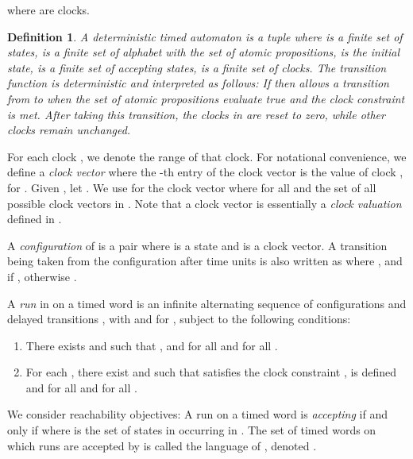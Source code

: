\documentclass[letterpaper, 10 pt, conference]{ieeeconf}
\newtheorem{definition}{Definition}
\begin{document}
where  are clocks.
\begin{definition}\cite{Alur1994183}
  A \emph{deterministic timed automaton} is a tuple
   where  is a
  finite set of states,  is a finite set of alphabet with
  the set  of atomic propositions,  is the initial
  state,  is a finite set of accepting states,  is a finite set
  of clocks. The transition function
   is
  deterministic and interpreted as follows: If
   then  allows a transition from
   to  when the set  of atomic propositions
  evaluate true and the clock constraint  is
  met. After taking this transition, the clocks in  are
  reset to zero, while other clocks remain unchanged.
\end{definition} 







For each clock , we denote  the range of that
clock.  For notational convenience, we define a \emph{clock vector}
 where the -th entry  of the clock vector 
is the value of clock , for . Given
, let
.  We use  for the
clock vector  where  for all  and
 the set of all possible clock
vectors in . Note that a clock vector is essentially a
\emph{clock valuation} defined in \cite{Alur1994183}.

A \emph{configuration} of  is a pair  where  is a
state and  is a clock vector. A transition
 being taken from the configuration 
after  time units is also written as
 where
, and  if
, otherwise .


A \emph{run} in  on a timed word
 is an infinite alternating
sequence of configurations and delayed transitions
,
with  and 
for , subject to the following conditions:
\begin{enumerate}

\item There exists  and  such
  that ,
   and  for
  all  and  for all .
\item For each , there exist  and
   such that 
  satisfies the clock constraint ,
   is defined and
   for all 
  and  for all .
\end{enumerate} 


We consider reachability objectives: A run  on a timed word 
is \emph{accepting} if and only if 
where  is the set of states in  occurring in
. The set of timed words on which runs are accepted by 
is called the language of , denoted .
\end{document}
